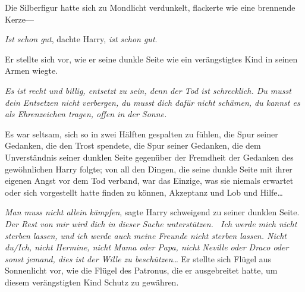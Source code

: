 Die Silberfigur hatte sich zu Mondlicht verdunkelt, flackerte wie eine brennende Kerze—

\emph{Ist schon gut}, dachte Harry, \emph{ist schon gut}.

Er stellte sich vor, wie er seine dunkle Seite wie ein verängstigtes Kind in seinen Armen wiegte.

\emph{Es ist recht und billig, entsetzt zu sein, denn der Tod ist schrecklich. Du musst dein Entsetzen nicht verbergen, du musst dich dafür nicht schämen, du kannst es als Ehrenzeichen tragen, offen in der Sonne.}

Es war seltsam, sich so in zwei Hälften gespalten zu fühlen, die Spur seiner Gedanken, die den Trost spendete, die Spur seiner Gedanken, die dem Unverständnis seiner dunklen Seite gegenüber der Fremdheit der Gedanken des gewöhnlichen Harry folgte; von all den Dingen, die seine dunkle Seite mit ihrer eigenen Angst vor dem Tod verband, war das Einzige, was sie niemals erwartet oder sich vorgestellt hatte finden zu können, Akzeptanz und Lob und Hilfe…

\emph{Man muss nicht allein kämpfen}, sagte Harry schweigend zu seiner dunklen Seite. \emph{Der Rest von mir wird dich in dieser Sache unterstützen. ~Ich werde mich nicht sterben lassen, und ich werde auch meine Freunde nicht sterben lassen. Nicht du/Ich, nicht Hermine, nicht Mama oder Papa, nicht Neville oder Draco oder sonst jemand, dies ist der Wille zu beschützen}… Er stellte sich Flügel aus Sonnenlicht vor, wie die Flügel des Patronus, die er ausgebreitet hatte, um diesem verängstigten Kind Schutz zu gewähren.

